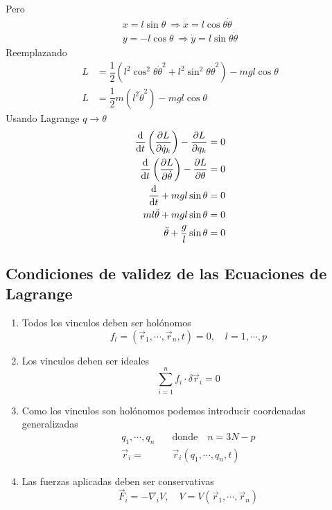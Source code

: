 \documentclass[../main]{subfiles}
\begin{document}
Pero 
\begin{align*}
    x=l\sin \theta \ \Rightarrow \dot{x}=l\cos \theta \dot{\theta}\\
    y=-l\cos \theta \ \Rightarrow \dot{y}=l\sin \theta \dot{\theta}
\end{align*}
Reemplazando
\begin{align*}
    L&=\dfrac{1}{2}(l^2 \cos^2 \theta \dot{\theta}^2+l^2 \sin^2 \theta \dot{\theta}^2)-mgl\cos \theta \\
    L&=\dfrac{1}{2}m(l^2 \dot{\theta}^2)-mgl\cos \theta
\end{align*}
Usando Lagrange $q\rightarrow \theta$
\begin{align*}
    \dv{}{t}\left(\pdv{L}{\dot{q}_k}\right)-\pdv{L}{q_k}=0 \\
    \dv{}{t}\left(\pdv{L}{\dot{\theta}}\right)-\pdv{L}{\theta}=0 \\
    \dv{}{t}(ml^2\dot{\theta})+mgl\sin \theta=0 \\
    ml\ddot{\theta}+mgl\sin \theta=0 \\
    \ddot{\theta}+\dfrac{g}{l}\sin \theta =0
\end{align*}

\subsection{Condiciones de validez de las Ecuaciones de Lagrange}
\begin{enumerate}
    \item Todos los vinculos deben ser holónomos
    \begin{equation}
        f_l=(\vec{r}_1, \cdots, \vec{r}_n, t)=0, \quad l=1,\cdots, p
    \end{equation}
    \item Los vinculos deben ser ideales
    \begin{equation}
        \sum_{i=1}^n f_i \cdot \delta \vec{r}_i=0
    \end{equation}
    \item Como los vinculos son holónomos podemos introducir coordenadas generalizadas
    \begin{equation}
        \begin{split}
            q_1, \cdots, q_n \quad &\text{donde} \quad n=3N-p \\
            \vec{r}_i=&\vec{r}_i(q_1, \cdots, q_n, t)
        \end{split}
    \end{equation}
    \item Las fuerzas aplicadas deben ser conservativas
    \begin{equation}
        \vec{F}_i=-\nabla_i V, \quad V=V(\vec{r}_1, \cdots, \vec{r}_n)
    \end{equation}
\end{enumerate}
\end{document}
